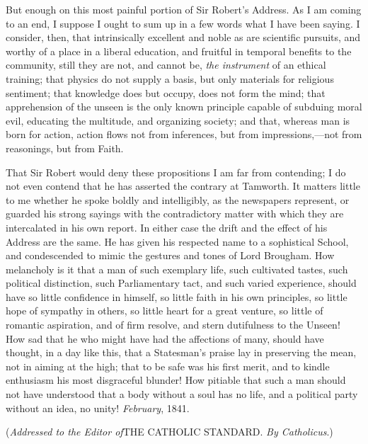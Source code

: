 But enough on this most painful portion of Sir Robert's Address. As
I am coming to an end, I suppose I ought to sum up in a few words what
I have been saying. I consider, then, that intrinsically excellent and
noble as are scientific pursuits, and worthy of a place in a liberal
education, and fruitful in temporal benefits to the community, still
they are not, and cannot be, \emph{the instrument} of an ethical
training; that physics do not supply a basis, but only materials for
religious sentiment; that knowledge does but occupy, does not form the
mind; that apprehension of the unseen is the only known principle
capable of subduing moral evil, educating the multitude, and
organizing society; and that, whereas man is born for action, action
flows not from inferences, but from impressions,—not from reasonings,
but from Faith.

That Sir Robert would deny these propositions I am far from
contending; I do not even contend that he has asserted the contrary at
Tamworth. It matters little to me whether he spoke boldly and
intelligibly, as the newspapers represent, or guarded his strong
sayings with the contradictory matter with which they are intercalated
in his own report. In either case the drift and the effect of his
Address are the same. He has given his respected name to a sophistical
School, and condescended to mimic the gestures and tones of Lord
Brougham. How melancholy is it that a man of such exemplary life, such
cultivated tastes, such political distinction, such Parliamentary
tact, and such varied experience, should have so little confidence in
himself, so little faith in his own principles, so little hope of
sympathy in others, so little heart for a great venture, so little of
romantic aspiration, and of firm resolve, and stern dutifulness to the
Unseen! How sad that he who might have had the affections of many,
should have thought, in a day like this, that a Statesman's praise lay
in preserving the mean, not in aiming at the high; that to be safe was
his first merit, and to kindle enthusiasm his most disgraceful
blunder! How pitiable that such a man should not have understood that
a body without a soul has no life, and a political party without an
idea, no unity!
\emph{February}, 1841.


(\emph{Addressed
to the Editor of}THE CATHOLIC
STANDARD. \emph{By Catholicus}.)


